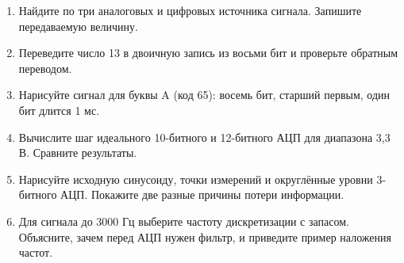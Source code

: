 \begin{tasks}
\begin{enumerate}
\item {} Найдите по три аналоговых и цифровых источника сигнала. Запишите передаваемую величину.
\item {} Переведите число 13 в двоичную запись из восьми бит и проверьте обратным переводом.
\item {} Нарисуйте сигнал для буквы A (код 65): восемь бит, старший первым, один бит длится 1 мс.
\item {} Вычислите шаг идеального 10-битного и 12-битного АЦП для диапазона 3,3 В. Сравните результаты.
\item {} Нарисуйте исходную синусоиду, точки измерений и округлённые уровни 3-битного АЦП. Покажите две разные причины потери информации.
\item {} Для сигнала до 3000 Гц выберите частоту дискретизации с запасом. Объясните, зачем перед АЦП нужен фильтр, и приведите пример наложения частот.
\end{enumerate}
\end{tasks}


\endgroup
